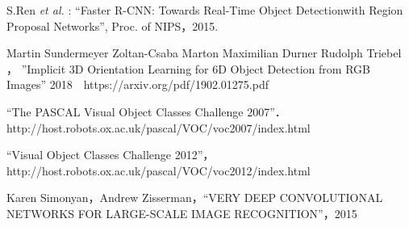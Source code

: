 \documentclass[11pt,a4j,ascmac]{jsarticle}
\begin{document}
\footnotesize
\begin{thebibliography}{99}%



S.Ren {\em et al. }: ``Faster R-CNN: Towards Real-Time Object Detectionwith Region Proposal Networks'', Proc. of NIPS，2015.


Martin Sundermeyer Zoltan-Csaba Marton Maximilian Durner Rudolph Triebel ， ''Implicit 3D Orientation Learning for 6D Object Detection from RGB Images''  2018　https://arxiv.org/pdf/1902.01275.pdf


``The PASCAL Visual Object Classes Challenge 2007''．http://host.robots.ox.ac.uk/pascal/VOC/voc2007/index.html

``Visual Object Classes Challenge 2012''，http://host.robots.ox.ac.uk/pascal/VOC/voc2012/index.html


Karen Simonyan，Andrew Zisserman，``VERY DEEP CONVOLUTIONAL NETWORKS FOR LARGE-SCALE IMAGE RECOGNITION''，2015








\end{thebibliography}

\normalsize
\end{document}
